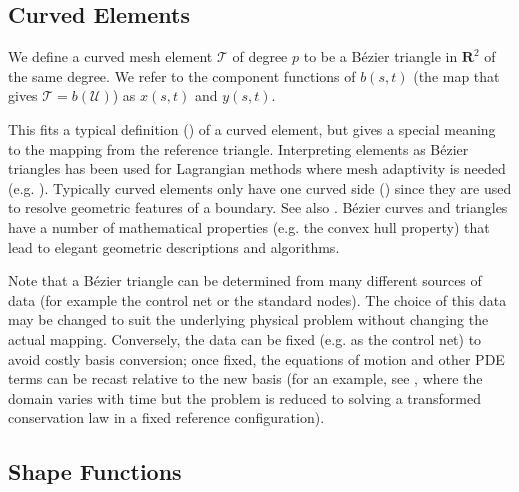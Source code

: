 \documentclass[oneside, reqno]{amsart}
\theoremstyle{definition}
\newcommand{\reals}{\mathbf{R}}
\newcommand{\utri}{\mathcal{U}}
\begin{document}
\subsection{Curved Elements}\label{sec:curved-elements}

We define a curved mesh element \(\mathcal{T}\) of degree \(p\)
to be a B\'{e}zier triangle in \(\reals^2\) of the same degree.
We refer to the component functions of \(b(s, t)\) (the map that
gives \(\mathcal{T} = b\left(\utri\right)\)) as \(x(s, t)\) and \(y(s, t)\).

This fits a typical definition (\cite[Chapter~12]{FEM-ClaesJohnson})
of a curved element, but gives a special meaning to the mapping from
the reference triangle. Interpreting elements as B\'{e}zier triangles
has been used for Lagrangian methods where
mesh adaptivity is needed (e.g. \cite{CardozeMOP04}). Typically curved
elements only have one curved side (\cite{McLeod1972}) since they are used
to resolve geometric features of a boundary. See also
\cite{Zlmal1973, Zlmal1974}.
B\'{e}zier curves and triangles have a number of mathematical properties
(e.g. the convex hull property) that lead to elegant geometric
descriptions and algorithms.

Note that a B\'{e}zier triangle can be
determined from many different sources of data (for example the control net
or the standard nodes). The choice of this data may be changed to suit the
underlying physical problem without changing the actual mapping. Conversely,
the data can be fixed (e.g. as the control net) to avoid costly basis
conversion; once fixed, the equations of motion and other PDE terms can
be recast relative to the new basis (for an example, see \cite{Persson2009},
where the domain varies with time but the problem is reduced to
solving a transformed conservation law in a fixed reference configuration).

\subsection{Shape Functions}\label{subsec:shape-functions}
\end{document}

